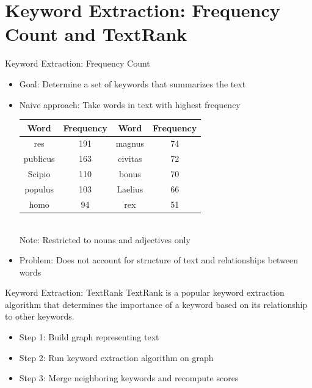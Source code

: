 \documentclass{beamer}
\begin{document}
\section{Keyword Extraction: Frequency Count and TextRank}

\begin{frame}{Keyword Extraction: Frequency Count}
\begin{itemize}
		\setlength\itemsep{1em}
	\item Goal: Determine a set of keywords that summarizes the text
	\item Naive approach: Take words in text with highest frequency
	\begin{center}
	\begin{tabular}{| c | c || c | c |}
		\hline
		\textbf{Word} & \textbf{Frequency} & \textbf{Word} & \textbf{Frequency} \\ \hline
		res & 191 & magnus & 74 \\ \hline
		publicus & 163 & civitas & 72 \\ \hline
		Scipio & 110 & bonus & 70  \\ \hline
		populus & 103 & Laelius & 66  \\ \hline
		homo & 94 & rex & 51  \\
		\hline
\end{tabular}\\
\footnotesize{Note: Restricted to nouns and adjectives only}
\end{center}
	
	\item Problem: Does not account for structure of text and relationships between words
\end{itemize}
\end{frame}

\begin{frame}{Keyword Extraction: TextRank}
TextRank is a popular keyword extraction algorithm that determines the importance of a keyword based on its relationship to other keywords.
\begin{itemize}

	\item Step 1: Build graph representing text
	\item Step 2: Run keyword extraction algorithm on graph
	\item Step 3: Merge neighboring keywords and recompute scores
\end{itemize}
\end{frame}
\end{document}
